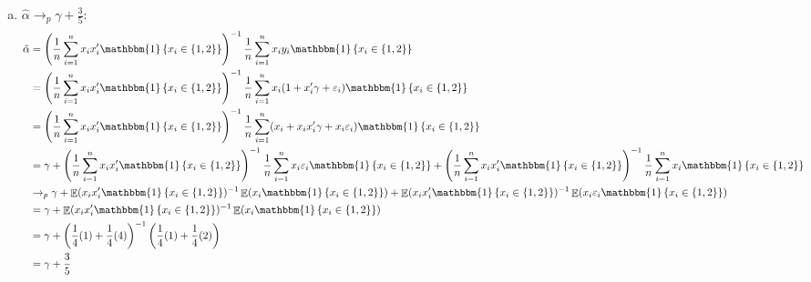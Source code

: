 \documentclass{article}
\newcommand{\est}[1]{\frac{1}{#1}\sum_{i=1}^{#1}}
\newcommand{\ahat}{\hat{\alpha}}
\newcommand{\one}[1]{\mathbbm{1}\left\{#1\right\}}
\DeclareMathOperator{\E}{\mathbb{E}}%
\begin{document}
\begin{enumerate}[(a)]
	\item ${\hat{\alpha}\rightarrow_p \gamma + \frac{3}{5}}$:
		\begin{align*}
			\ahat	&= \left(\est{n}x_ix_i'\one{x_i\in\{1,2\}}\right)^{-1}\est{n}x_iy_i\one{x_i\in\{1,2\}}	\\
					&= \left(\est{n}x_ix_i'\one{x_i\in\{1,2\}}\right)^{-1}\est{n}x_i(1+x_i'\gamma + \varepsilon_i)\one{x_i\in\{1,2\}}	\\
					&= \left(\est{n}x_ix_i'\one{x_i\in\{1,2\}}\right)^{-1}\est{n}(x_i + x_ix_i'\gamma + x_i\varepsilon_i)\one{x_i\in\{1,2\}}	\\
					&= \gamma + \left(\est{n}x_ix_i'\one{x_i\in\{1,2\}}\right)^{-1}\est{n}x_i\varepsilon_i\one{x_i\in\{1,2\}} 
							+ \left(\est{n}x_ix_i'\one{x_i\in\{1,2\}}\right)^{-1}\est{n}x_i\one{x_i\in\{1,2\}}\\
					&\rightarrow_p \gamma + \E(x_ix_i'\one{x_i\in\{1,2\}})^{-1}\E(x_i\one{x_i\in\{1,2\}}) + \E(x_ix_i'\one{x_i\in\{1,2\}})^{-1}\E(x_i\varepsilon_i\one{x_i\in\{1,2\}})	\\
					&= \gamma + \E(x_ix_i'\one{x_i\in\{1,2\}})^{-1}\E(x_i\one{x_i\in\{1,2\}}) 	\\
					&= \gamma + \left(\frac{1}{4}(1) + \frac{1}{4}(4)\right)^{-1}\left(\frac{1}{4}(1) + \frac{1}{4}(2)\right) 	\\
					&= \gamma + \frac{3}{5}
		\end{align*}
		

\end{enumerate}
\end{document}
